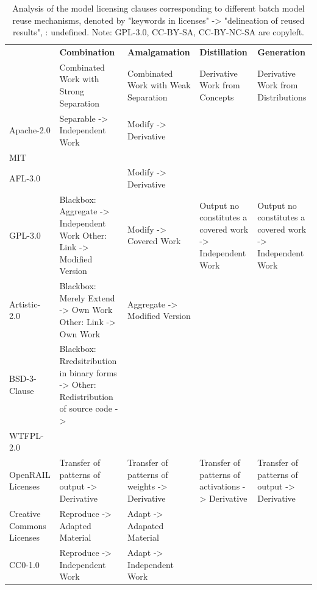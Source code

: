 \documentclass[journal]{IEEEtran}
\newcommand{\xmark}{\ding{55}}
\begin{document}
\begin{table}[t]
  \centering
  \scriptsize
  \caption{Analysis of the model licensing clauses corresponding to different batch model reuse mechanisms, denoted by "keywords in licenses" -> "delineation of reused results", \xmark: undefined. Note: GPL-3.0, CC-BY-SA, CC-BY-NC-SA are copyleft.}
  \label{tab:reuse}
  \begin{tabular}{|p{2.1cm}|p{4.7cm}|p{3.1cm}|p{3.2cm}|p{2.3cm}|}
    \hline
    \multirow{2}{*}{}& \textbf{Combination} & \textbf{Amalgamation} & \textbf{Distillation} & \textbf{Generation} \\ \cline{2-5}
    & Combinated Work with Strong Separation & Combinated Work with \newline Weak Separation & Derivative Work from Concepts & Derivative Work \newline from Distributions \\ \hline
    Apache-2.0 & Separable -> Independent Work & Modify -> Derivative & \xmark & \xmark \\ \hline
    MIT & \xmark & \xmark & \xmark & \xmark \\ \hline
    AFL-3.0 & \xmark & Modify -> Derivative & \xmark & \xmark \\ \hline
    GPL-3.0 & Blackbox: Aggregate -> Independent Work \newline Other: Link -> Modified Version  & Modify -> Covered Work & Output no constitutes a covered work -> Independent Work & Output no constitutes a covered work ->  \newline Independent Work  \\ \hline
    Artistic-2.0 & Blackbox: Merely Extend -> Own Work \newline Other: Link -> Own Work & Aggregate -> Modified Version & \xmark & \xmark \\ \hline
    BSD-3-Clause & Blackbox: Rredsitribution in binary forms -> \xmark \newline Other: Redistribution of source code -> \xmark & \xmark & \xmark & \xmark \\ \hline
    WTFPL-2.0 & \xmark & \xmark & \xmark & \xmark \\ \hline
    OpenRAIL Licenses & Transfer of patterns of \newline output -> Derivative & Transfer of patterns of weights -> Derivative & Transfer of patterns of activations -> Derivative & Transfer of patterns of output -> Derivative \\ \hline
    Creative Commons \newline Licenses & Reproduce -> Adapted Material & Adapt -> Adapated Material & \xmark & \xmark \\ \hline
    CC0-1.0 & Reproduce -> Independent Work & Adapt -> Independent Work & \xmark & \xmark \\ \hline
  \end{tabular}
\end{table}
\end{document}
